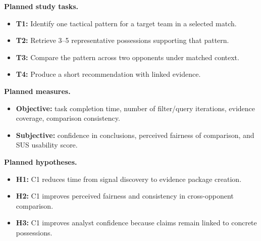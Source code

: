 \documentclass{vgtc}                          %
\begin{document}
\noindent\textbf{Planned study tasks.}
\begin{itemize}[leftmargin=*]
\item \textbf{T1:} Identify one tactical pattern for a target team in a selected match.
\item \textbf{T2:} Retrieve 3--5 representative possessions supporting that pattern.
\item \textbf{T3:} Compare the pattern across two opponents under matched context.
\item \textbf{T4:} Produce a short recommendation with linked evidence.
\end{itemize}

\noindent\textbf{Planned measures.}
\begin{itemize}[leftmargin=*]
\item \textbf{Objective:} task completion time, number of filter/query iterations, evidence coverage, comparison consistency.
\item \textbf{Subjective:} confidence in conclusions, perceived fairness of comparison, and SUS usability score.
\end{itemize}

\noindent\textbf{Planned hypotheses.}
\begin{itemize}[leftmargin=*]
\item \textbf{H1:} C1 reduces time from signal discovery to evidence package creation.
\item \textbf{H2:} C1 improves perceived fairness and consistency in cross-opponent comparison.
\item \textbf{H3:} C1 improves analyst confidence because claims remain linked to concrete possessions.
\end{itemize}
\end{document}
